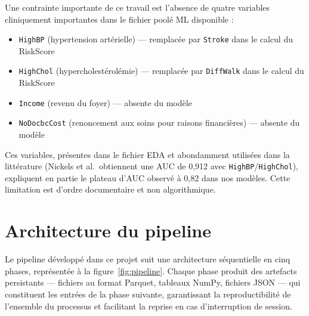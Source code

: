 Une contrainte importante de ce travail est l'absence de quatre variables cliniquement importantes dans le fichier poolé ML disponible :

\begin{itemize}
    \item \texttt{HighBP} (hypertension artérielle) — remplacée par \texttt{Stroke} dans le calcul du RiskScore
    \item \texttt{HighChol} (hypercholestérolémie) — remplacée par \texttt{DiffWalk} dans le calcul du RiskScore
    \item \texttt{Income} (revenu du foyer) — absente du modèle
    \item \texttt{NoDocbcCost} (renoncement aux soins pour raisons financières) — absente du modèle
\end{itemize}

Ces variables, présentes dans le fichier EDA et abondamment utilisées dans la littérature (Nickels et al.\ obtiennent une AUC de 0,912 avec \texttt{HighBP}/\texttt{HighChol}), expliquent en partie le plateau d'AUC observé à 0,82 dans nos modèles. Cette limitation est d'ordre documentaire et non algorithmique.

\section{Architecture du pipeline}

Le pipeline développé dans ce projet suit une architecture séquentielle en cinq phases, représentée à la figure~\ref{fig:pipeline}. Chaque phase produit des artefacts persistants — fichiers au format Parquet, tableaux NumPy, fichiers JSON — qui constituent les entrées de la phase suivante, garantissant la reproductibilité de l'ensemble du processus et facilitant la reprise en cas d'interruption de session.


